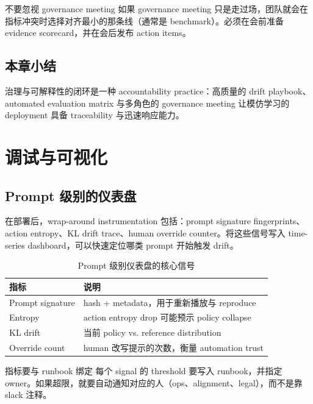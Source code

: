 \documentclass[a4paper]{article}
\begin{document}
\begin{warningbox}{不要忽视 governance meeting}
如果 governance meeting 只是走过场，团队就会在指标冲突时选择对齐最小的那条线（通常是 benchmark）。必须在会前准备 evidence scorecard，并在会后发布 action items。
\end{warningbox}

\subsection{本章小结}

治理与可解释性的闭环是一种 accountability practice：高质量的 drift playbook、automated evaluation matrix 与多角色的 governance meeting 让模仿学习的 deployment 具备 traceability 与迅速响应能力。

\section{调试与可视化}

\subsection{Prompt 级别的仪表盘}

在部署后，wrap-around instrumentation 包括：prompt signature fingerprints、action entropy、KL drift trace、human override counter。将这些信号写入 time-series dashboard，可以快速定位哪类 prompt 开始触发 drift。

\begin{table}[H]
\centering
\begin{tabular}{p{} p{}}
\toprule
指标 & 说明 \\
\midrule
Prompt signature & hash + metadata，用于重新播放与 reproduce \\
Entropy & action entropy drop 可能预示 policy collapse \\
KL drift & 当前 policy vs. reference distribution \\
Override count & human 改写提示的次数，衡量 automation trust \\
\bottomrule
\end{tabular}
\caption{Prompt 级别仪表盘的核心信号}
\end{table}

\begin{importantbox}{指标要与 runbook 绑定}
每个 signal 的 threshold 要写入 runbook，并指定 owner。如果超限，就要自动通知对应的人（ops、alignment、legal），而不是靠 slack 注释。
\end{importantbox}
\end{document}
